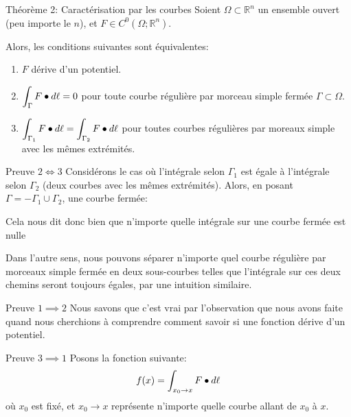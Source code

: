 \documentclass[a4paper]{article}
\begin{document}
\begin{parag}{Théorème 2: Caractérisation par les courbes}
    Soient $\Omega \subset \mathbb{R}^n$ un ensemble ouvert (peu importe le $n$), et $F \in C^{0}\left(\Omega; \mathbb{R}^n\right)$.

    Alors, les conditions suivantes sont équivalentes:
    \begin{enumerate}[left=0pt]
        \item $F$ dérive d'un potentiel.
        \item $\displaystyle \int_{\Gamma} F \bullet d \ell = 0$ pour toute courbe régulière par morceau simple fermée $\Gamma \subset \Omega$.
        \item $\displaystyle \int_{\Gamma_1} F \bullet d \ell = \int_{\Gamma_2} F \bullet d \ell$ pour toutes courbes régulières par moreaux simple avec les mêmes extrémités.
    \end{enumerate}

    \begin{subparag}{Preuve $2 \iff 3$}
        Considérons le cas où l'intégrale selon $\Gamma_1$ est égale à l'intégrale selon $\Gamma_2$ (deux courbes avec les mêmes extrémités). Alors, en posant $\Gamma = -\Gamma_1 \cup \Gamma_2$, une courbe fermée:

        Cela nous dit donc bien que n'importe quelle intégrale sur une courbe fermée est nulle
        
        Dans l'autre sens, nous pouvons séparer n'importe quel courbe régulière par morceaux simple fermée en deux sous-courbes telles que l'intégrale sur ces deux chemins seront toujours égales, par une intuition similaire.
        
    \end{subparag}

    \begin{subparag}{Preuve $1 \implies 2$}
        Nous savons que c'est vrai par l'observation que nous avons faite quand nous cherchions à comprendre comment savoir si une fonction dérive d'un potentiel.
    \end{subparag}

    \begin{subparag}{Preuve $3 \implies 1$}
        Posons la fonction suivante: 
        \[f\left(x\right) = \int_{x_0 \to x} F \dotprod d \ell\]
        où $x_0$ est fixé, et $x_0 \to x$ représente n'importe quelle courbe allant de $x_0$ à $x$.


\end{subparag}
\end{parag}
\end{document}
